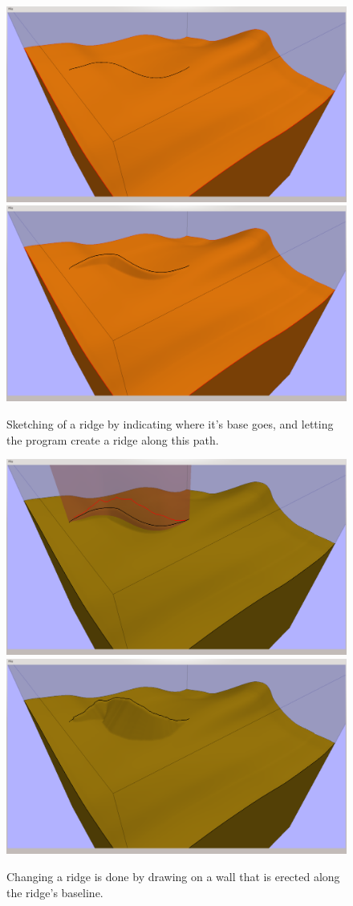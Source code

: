 \documentclass[a4paper,12pt]{report}
\begin{document}
\begin{figure}
\includegraphics[trim = 30mm 80mm 120mm 30mm, clip,width=.5\linewidth]{thesis/results/ridgeDraw.png}
\includegraphics[trim = 30mm 80mm 120mm 30mm, clip,width=.5\linewidth]{thesis/results/ridgeDrawn.png}
 \caption{Sketching of a ridge by indicating where it's base goes, and letting the program create a ridge along this path. }
 \label{fig:ridgeDraw}
\end{figure}

\begin{figure}
\includegraphics[trim = 30mm 80mm 120mm 30mm, clip,width=.5\linewidth]{thesis/results/ridgeChange.png}
\includegraphics[trim = 30mm 80mm 120mm 30mm, clip,width=.5\linewidth]{thesis/results/ridgeChanged.png}
 \caption{Changing a ridge is done by drawing on a wall that is erected along the ridge's baseline. }
 \label{fig:ridgeChange}
\end{figure}
\end{document}
